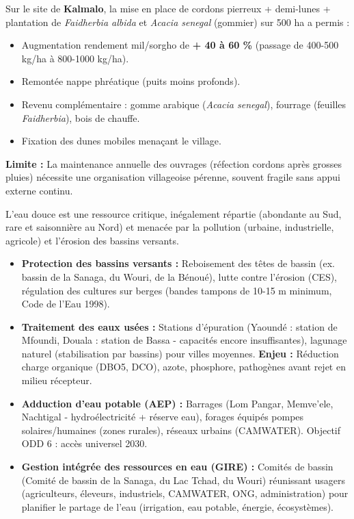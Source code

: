\documentclass[11pt]{article}
\newcounter{popsec}
\newcounter{popsub}
\newcommand{\courssub}[1]{%
  \stepcounter{popsub}%
  \par\vspace{9pt}\noindent{\popxbold\fontsize{11.5}{13}\selectfont\color{popink}{\color{poporange}\thepopsec.\thepopsub}\hspace{6pt}#1}\par\nopagebreak\vspace{4pt}
}
\begin{document}
\begin{exemplebox}
Sur le site de \textbf{Kalmalo}, la mise en place de cordons pierreux + demi-lunes + plantation de \emph{Faidherbia albida} et \emph{Acacia senegal} (gommier) sur 500 ha a permis :
\begin{itemize}
    \item Augmentation rendement mil/sorgho de \textbf{+ 40 à 60 \%} (passage de 400-500 kg/ha à 800-1000 kg/ha).
    \item Remontée nappe phréatique (puits moins profonds).
    \item Revenu complémentaire : gomme arabique (\emph{Acacia senegal}), fourrage (feuilles \emph{Faidherbia}), bois de chauffe.
    \item Fixation des dunes mobiles menaçant le village.
\end{itemize}
\textbf{Limite :} La maintenance annuelle des ouvrages (réfection cordons après grosses pluies) nécessite une organisation villageoise pérenne, souvent fragile sans appui externe continu.
\end{exemplebox}

\courssub{Gestion de l'eau : de la ressource au service}

L'eau douce est une ressource critique, inégalement répartie (abondante au Sud, rare et saisonnière au Nord) et menacée par la pollution (urbaine, industrielle, agricole) et l'érosion des bassins versants.

\begin{propriete}
\begin{itemize}
    \item \textbf{Protection des bassins versants :} Reboisement des têtes de bassin (ex. bassin de la Sanaga, du Wouri, de la Bénoué), lutte contre l'érosion (CES), régulation des cultures sur berges (bandes tampons de 10-15 m minimum, Code de l'Eau 1998).
    \item \textbf{Traitement des eaux usées :} Stations d'épuration (Yaoundé : station de Mfoundi, Douala : station de Bassa - capacités encore insuffisantes), lagunage naturel (stabilisation par bassins) pour villes moyennes. \textbf{Enjeu :} Réduction charge organique (DBO5, DCO), azote, phosphore, pathogènes avant rejet en milieu récepteur.
    \item \textbf{Adduction d'eau potable (AEP) :} Barrages (Lom Pangar, Memve'ele, Nachtigal - hydroélectricité + réserve eau), forages équipés pompes solaires/humaines (zones rurales), réseaux urbains (CAMWATER). Objectif ODD 6 : accès universel 2030.
    \item \textbf{Gestion intégrée des ressources en eau (GIRE) :} Comités de bassin (Comité de bassin de la Sanaga, du Lac Tchad, du Wouri) réunissant usagers (agriculteurs, éleveurs, industriels, CAMWATER, ONG, administration) pour planifier le partage de l'eau (irrigation, eau potable, énergie, écosystèmes).
\end{itemize}
\end{propriete}
\end{document}
